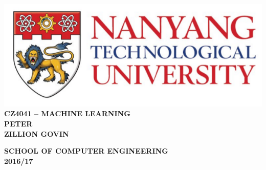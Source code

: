 \begin{titlepage}
	\begin{center}
		
		\includegraphics[width=1\textwidth]{./ntu_logo.png}
		\\[5cm]
		
		\uppercase{\textbf{CZ4041 -- MACHINE LEARNING}}
		\\[5cm]
		
		\uppercase{
			\textbf{
				PETER
				\\
				ZILLION GOVIN
		}}	
		
		\vfill
		
		\textsc{\bfseries SCHOOL OF COMPUTER ENGINEERING}
		\\
		\textbf{2016/17}
		
	\end{center}
\end{titlepage}